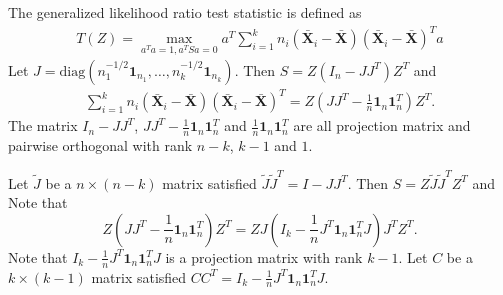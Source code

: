 \documentclass[review]{elsarticle}
\theoremstyle{plain}
\theoremstyle{definition}
\theoremstyle{remark}
\begin{document}
The generalized likelihood ratio test statistic is defined as
\begin{equation}
    \begin{aligned}
        T(Z)
        =
        \max_{a^T a=1, a^T S a=0} 
        a^T \sum_{i=1}^k n_i (\bar{\mathbf{X}}_i-\bar{\mathbf{X}})(\bar{\mathbf{X}}_i-\bar{\mathbf{X}})^T a
    \end{aligned}
\end{equation}
Let $J=\mathrm{diag}(n_1^{-1/2}\mathbf{1}_{n_1},\ldots,n_k^{-1/2}\mathbf{1}_{n_k})$.
Then $S=Z(I_n-JJ^T)Z^T$ and
\begin{equation}
    \begin{aligned}
        \sum_{i=1}^k n_i (\bar{\mathbf{X}}_i-\bar{\mathbf{X}})(\bar{\mathbf{X}}_i-\bar{\mathbf{X}})^T 
        =Z(JJ^T-\frac{1}{n}\mathbf{1}_n\mathbf{1}_n^T)Z^T.
    \end{aligned}
\end{equation}
The matrix $I_n-JJ^T$, $JJ^T-\frac{1}{n}\mathbf{1}_n\mathbf{1}_n^T$ and $\frac{1}{n}\mathbf{1}_n\mathbf{1}_n^T$ are all projection matrix and pairwise orthogonal with rank $n-k$, $k-1$ and $1$.

Let $\tilde{J}$ be a $n\times (n-k)$ matrix satisfied $\tilde{J}\tilde{J}^T =I-JJ^T$.
Then $S=Z\tilde{J}\tilde{J}^T Z^T$ and
 Note that 
$$
Z(JJ^T-\frac{1}{n}\mathbf{1}_n\mathbf{1}_n^T)Z^T
=ZJ(I_k-\frac{1}{n}J^T\mathbf{1}_n \mathbf{1}_n^T J)J^T Z^T.
$$
Note that $I_k-\frac{1}{n}J^T\mathbf{1}_n \mathbf{1}_n^T J$ is a projection matrix with rank $k-1$.
Let $C$ be a $k\times (k-1)$ matrix satisfied $CC^T=I_k-\frac{1}{n}J^T\mathbf{1}_n \mathbf{1}_n^T J$.
\end{document}
